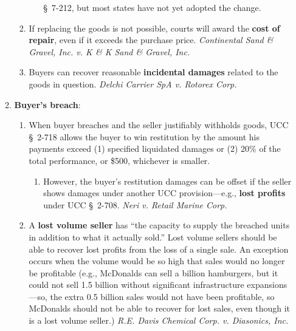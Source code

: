 \begin{enumerate}
\begin{enumerate}
\begin{enumerate}
\begin{itemize}
                \S\ 7-212, but most states have not yet adopted the change.
            \end{itemize}
            \item If replacing the goods is not possible, courts will award 
            the \textbf{cost of repair}, even if it exceeds the purchase 
            price.  \emph{Continental Sand \& Gravel, Inc. v. K \& K Sand \& 
            Gravel, Inc.}
            \item Buyers can recover reasonable \textbf{incidental damages} 
            related to the goods in question. \emph{Delchi Carrier SpA v. 
            Rotorex Corp.}
        \end{enumerate}
        \item \textbf{Buyer's breach}:
        \begin{enumerate}
            \item When buyer breaches and the seller justifiably withholds 
            goods, UCC \S\ 2-718 allows the buyer to win restitution by the 
            amount his payments exceed (1) specified liquidated damages or (2) 
            20\% of the total performance, or \$500, whichever is smaller.
            \begin{enumerate}
                \item However, the buyer's restitution damages can be offset 
                if the seller shows damages under another UCC 
                provision---e.g., \textbf{lost profits} under UCC \S\ 2-708. 
                \emph{Neri v. Retail Marine Corp.}
            \end{enumerate}
            \item A \textbf{lost volume seller} has ``the capacity to supply 
            the breached units in addition to what it actually sold.'' Lost 
            volume sellers should be able to recover lost profits from the 
            loss of a single sale. An exception occurs when the volume would 
            be so high that sales would no longer be profitable (e.g., 
            McDonalds can sell a billion hamburgers, but it could not sell 1.5 
            billion without significant infrastructure expansions---so, the 
            extra 0.5 billion sales would not have been profitable, so 
            McDonalds should not be able to recover for lost sales, even 
            though it is a lost volume seller.) \emph{R.E. Davis Chemical Corp. 
            v. Diasonics, Inc.}
            \begin{enumerate}

\end{enumerate}
\end{enumerate}
\end{enumerate}
\end{enumerate}
